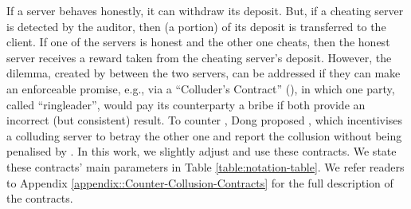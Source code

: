 If a server behaves honestly, it can withdraw its deposit. But, if a cheating server is detected by the auditor, then (a portion) of its deposit is transferred to the client. If one of the servers is honest and the other one cheats, then the honest server receives a reward taken from the cheating server's deposit. However, the dilemma, created by \SCpc between the two servers, can be addressed if they can make an enforceable promise, e.g., via a ``Colluder's Contract'' (\SCcc),  in which one party, called ``ringleader'', would pay its counterparty a bribe if both provide an incorrect (but consistent) result. To counter \SCcc, Dong   \et proposed \SCtc, which incentivises a colluding server to betray the other one and report the collusion without being penalised by \SCpc. In this work, we slightly adjust and use these contracts. We state these contracts' main parameters in Table \ref{table:notation-table}. We refer readers to Appendix \ref{appendix::Counter-Collusion-Contracts} for the full description of the  contracts. 




%


